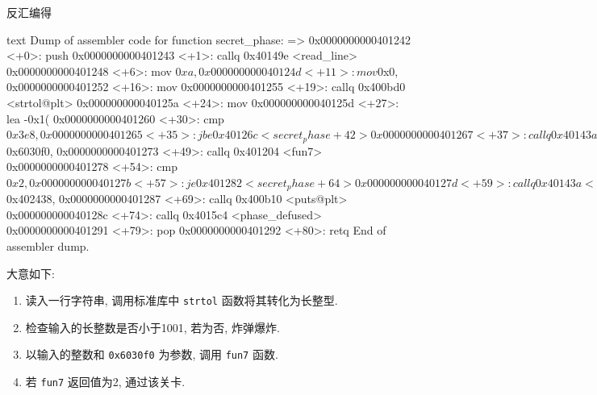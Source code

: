 反汇编得
\begin{code}{text}
    Dump of assembler code for function secret_phase:
    => 0x0000000000401242 <+0>:     push   %
       0x0000000000401243 <+1>:     callq  0x40149e <read_line>
       0x0000000000401248 <+6>:     mov    $0xa,%
       0x000000000040124d <+11>:    mov    $0x0,%
       0x0000000000401252 <+16>:    mov    %
       0x0000000000401255 <+19>:    callq  0x400bd0 <strtol@plt>
       0x000000000040125a <+24>:    mov    %
       0x000000000040125d <+27>:    lea    -0x1(%
       0x0000000000401260 <+30>:    cmp    $0x3e8,%
       0x0000000000401265 <+35>:    jbe    0x40126c <secret_phase+42>
       0x0000000000401267 <+37>:    callq  0x40143a <explode_bomb>
       0x000000000040126c <+42>:    mov    %
       0x000000000040126e <+44>:    mov    $0x6030f0,%
       0x0000000000401273 <+49>:    callq  0x401204 <fun7>
       0x0000000000401278 <+54>:    cmp    $0x2,%
       0x000000000040127b <+57>:    je     0x401282 <secret_phase+64>
       0x000000000040127d <+59>:    callq  0x40143a <explode_bomb>
       0x0000000000401282 <+64>:    mov    $0x402438,%
       0x0000000000401287 <+69>:    callq  0x400b10 <puts@plt>
       0x000000000040128c <+74>:    callq  0x4015c4 <phase_defused>
       0x0000000000401291 <+79>:    pop    %
       0x0000000000401292 <+80>:    retq
    End of assembler dump.
\end{code}
大意如下:
\begin{enumerate}[noitemsep]
    \item 读入一行字符串, 调用标准库中 \verb|strtol| 函数将其转化为长整型.
    \item 检查输入的长整数是否小于1001, 若为否, 炸弹爆炸.
    \item 以输入的整数和 \verb|0x6030f0| 为参数, 调用 \verb|fun7| 函数. 
    \item 若 \verb|fun7| 返回值为2, 通过该关卡.
\end{enumerate}

